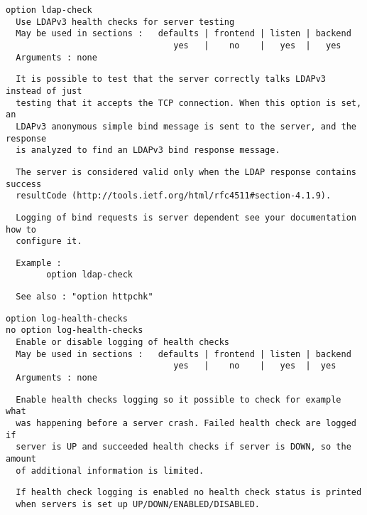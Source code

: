 \begin{verbatim}
option ldap-check
  Use LDAPv3 health checks for server testing
  May be used in sections :   defaults | frontend | listen | backend
                                 yes   |    no    |   yes  |   yes
  Arguments : none
\end{verbatim}

\begin{verbatim}
  It is possible to test that the server correctly talks LDAPv3 instead of just
  testing that it accepts the TCP connection. When this option is set, an
  LDAPv3 anonymous simple bind message is sent to the server, and the response
  is analyzed to find an LDAPv3 bind response message.
\end{verbatim}

\begin{verbatim}
  The server is considered valid only when the LDAP response contains success
  resultCode (http://tools.ietf.org/html/rfc4511#section-4.1.9).
\end{verbatim}

\begin{verbatim}
  Logging of bind requests is server dependent see your documentation how to
  configure it.
\end{verbatim}

\begin{verbatim}
  Example :
        option ldap-check
\end{verbatim}

\begin{verbatim}
  See also : "option httpchk"
\end{verbatim}

\begin{verbatim}
option log-health-checks
no option log-health-checks
  Enable or disable logging of health checks
  May be used in sections :   defaults | frontend | listen | backend
                                 yes   |    no    |   yes  |  yes
  Arguments : none
\end{verbatim}

\begin{verbatim}
  Enable health checks logging so it possible to check for example what
  was happening before a server crash. Failed health check are logged if
  server is UP and succeeded health checks if server is DOWN, so the amount
  of additional information is limited.
\end{verbatim}

\begin{verbatim}
  If health check logging is enabled no health check status is printed
  when servers is set up UP/DOWN/ENABLED/DISABLED.
\end{verbatim}

